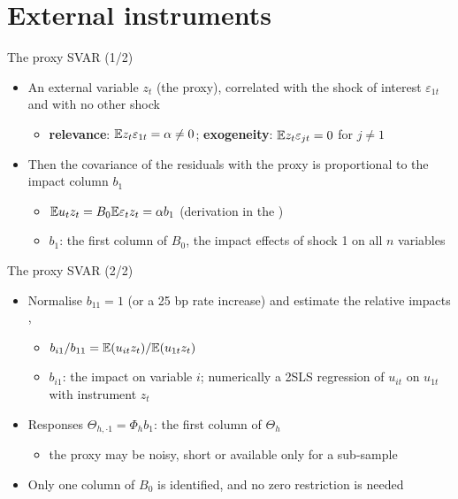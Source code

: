 \section{External instruments}

\begin{frame}{The proxy SVAR (1/2)}
\itemsize{\small}
\begin{itemize}
    \item An external variable $z_t$ (the proxy), correlated with the shock of interest $\varepsilon_{1t}$ and with no other shock
    \begin{itemize}
        \item \textbf{relevance}: $\mathbb{E} z_t\varepsilon_{1t} = \alpha \ne 0$; \textbf{exogeneity}: $\mathbb{E} z_t\varepsilon_{jt} = 0$ for $j \ne 1$
    \end{itemize}
    \item Then the covariance of the residuals with the proxy is proportional to the impact column $b_1$
    \begin{itemize}
        \item $\mathbb{E} u_tz_t = B_0\mathbb{E}\varepsilon_tz_t = \alpha b_1$ (derivation in the )
        \item $b_1$: the first column of $B_0$, the impact effects of shock 1 on all $n$ variables
    \end{itemize}
\end{itemize}
\end{frame}

\begin{frame}{The proxy SVAR (2/2)}
\itemsize{\small}
\begin{itemize}
    \item Normalise $b_{11} = 1$ (or a 25 bp rate increase) and estimate the relative impacts , 
    \begin{itemize}
        \item $b_{i1}/b_{11} = \mathbb{E}(u_{it}z_t)/\mathbb{E}(u_{1t}z_t)$
        \item $b_{i1}$: the impact on variable $i$; numerically a 2SLS regression of $u_{it}$ on $u_{1t}$ with instrument $z_t$
    \end{itemize}
    \item Responses $\Theta_{h,\cdot1} = \Phi_hb_1$: the first column of $\Theta_h$
    \begin{itemize}
        \item the proxy may be noisy, short or available only for a sub-sample
    \end{itemize}
    \item Only one column of $B_0$ is identified, and no zero restriction is needed
\end{itemize}
\end{frame}

